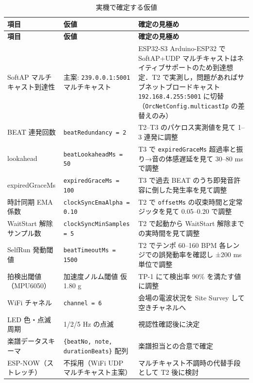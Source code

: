 \documentclass[lualatex,book,paper=a4paper,jafontsize=11.5pt,jafontscale=1.05]{jlreq}
\begin{document}
\begin{longtable}{L{0.18\textwidth} L{0.34\textwidth} L{0.40\textwidth}}
\caption{実機で確定する仮値}\label{tab:tbd}\\
\toprule
\textbf{項目} & \textbf{仮値} & \textbf{確定の見極め} \\
\midrule
\endfirsthead
\toprule
\textbf{項目} & \textbf{仮値} & \textbf{確定の見極め} \\
\midrule
\endhead
SoftAP マルチキャスト到達性 & 主案: \texttt{239.0.0.1:5001} マルチキャスト & ESP32-S3 Arduino-ESP32 で SoftAP+UDP マルチキャストはネイティブサポートのため到達想定．T2 で実測し，問題があればサブネットブロードキャスト \texttt{192.168.4.255:5001} に切替（\texttt{OrcNetConfig.multicastIp} の差替えのみ） \\
BEAT 連発回数            & \texttt{beatRedundancy = 2}                & T2--T3 のパケロス実測値を見て 1--3 連発に調整 \\
lookahead                & \texttt{beatLookaheadMs = 50}              & T3 で \texttt{expiredGraceMs} 超過率と振り→音の体感遅延を見て 30--80 ms で調整 \\
expiredGraceMs           & \texttt{expiredGraceMs = 100}              & T3 で過去 BEAT のうち即発音許容に倒した発生率を見て調整 \\
時計同期 EMA 係数        & \texttt{clockSyncEmaAlpha = 0.10}          & T2 で \texttt{offsetMs} の収束時間と定常ジッタを見て 0.05--0.20 で調整 \\
WaitStart 解除サンプル数 & \texttt{clockSyncMinSamples = 5}           & T2 で起動から WaitStart 解除までの実時間を見て調整 \\
SelfRun 発動閾値         & \texttt{beatTimeoutMs = 1500}              & T2 でテンポ 60--160 BPM 各レンジでの誤発動率を確認し ±200 ms 単位で調整 \\
拍検出閾値（MPU6050）    & 加速度ノルム閾値 仮 1.80 g                  & TP-1 にて検出率 90\% を満たす値に調整 \\
WiFi チャネル            & \texttt{channel = 6}                       & 会場の電波状況を Site Survey して空きチャネルへ \\
LED 色・点滅周期         & 1/2/5 Hz の点滅                            & 視認性確認後に決定 \\
楽譜データスキーマ       & \texttt{\{beatNo, note, durationBeats\}} 配列 & 楽譜担当との合意で確定 \\
ESP-NOW（ストレッチ）    & 不採用（WiFi UDP マルチキャスト主案）     & マルチキャスト不調時の代替手段として T2 後に検討 \\
\bottomrule
\end{longtable}
\end{document}
